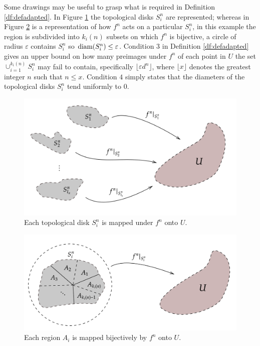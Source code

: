 Some drawings may be useful to grasp what is required in Definition \ref{df:defadapted}. In Figure \ref{fig:adaptedfig} the topological disks $S^n_i$ are represented; whereas in Figure \ref{fig:adaptedfig2} is a representation of how $f^n$ acts on a particular $S_i^n$, in this example the region is subdivided into $k_i(n)$ subsets on which $f^n$ is bijective, a circle of radius $\varepsilon$ contains $S_i^n$ so $\text{diam}(S_i^n)\leq \varepsilon$. Condition $3$ in Definition \ref{df:defadapted} gives an upper bound on how many preimages under $f^n$ of each point in $U$ the set $\cup_{i=1}^{k_i(n)} S_i^n$ may fail to contain, specifically $\lfloor \varepsilon d^n \rfloor$, where $\lfloor x \rfloor$ denotes the greatest integer $n$ such that $n\leq x$. Condition $4$ simply states that the diameters of the topological disks $S_i^n$ tend uniformly to $0$.

\begin{figure}[h!]
	\centering  
  \includegraphics[scale=.19]{d003}
  \caption{Each topological disk $S_i^n$ is mapped under $f^n$ onto $U$.}
  \label{fig:adaptedfig}
\end{figure}

\begin{figure}[h!]
	\centering  
  \includegraphics[scale=.18]{d005}
  \caption{Each region $A_i$ is mapped bijectively by $f^n$ onto $U$.}
  \label{fig:adaptedfig2}
\end{figure}


